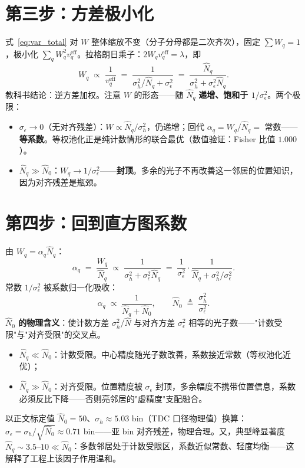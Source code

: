 \documentclass[11pt]{ctexart}
\begin{document}
\section{第三步：方差极小化}

式~\eqref{eq:var_total} 对 $W$ 整体缩放不变（分子分母都是二次齐次），固定 $\sum W_q=1$，极小化 $\sum_q W_q^2v^{\mathrm{eff}}_q$。拉格朗日乘子：$2W_qv^{\mathrm{eff}}_q=\lambda$，即
\begin{equation}
  W_q\;\propto\;\frac{1}{v^{\mathrm{eff}}_q}
  \;=\;\frac{1}{\sigma_h^2/\hat N_q+\sigma_\epsilon^2}
  \;=\;\frac{\hat N_q}{\sigma_h^2+\sigma_\epsilon^2\hat N_q}.
  \label{eq:W_opt}
\end{equation}
教科书结论：逆方差加权。注意 $W$ 的形态——随 $\hat N_q$ \textbf{递增、饱和于 $1/\sigma_\epsilon^2$}。两个极限：
\begin{itemize}
  \item $\sigma_\epsilon\to0$（无对齐残差）：$W\propto\hat N_q/\sigma_h^2$，仍递增；回代 $\alpha_q=W_q/\hat N_q=$ 常数——\textbf{等系数}。等权池化正是纯计数情形的联合最优（数值验证：Fisher 比值 $1.000$）。
  \item $\hat N_q\gg\hat N_0$：$W_q\to1/\sigma_\epsilon^2$——\textbf{封顶}。多余的光子不再改善这一邻居的位置知识，因为对齐残差是瓶颈。
\end{itemize}

\section{第四步：回到直方图系数}

由 $W_q=\alpha_q\hat N_q$：
\begin{equation}
  \alpha_q\;=\;\frac{W_q}{\hat N_q}
  \;\propto\;\frac{1}{\sigma_h^2+\sigma_\epsilon^2\hat N_q}
  \;=\;\frac{1}{\sigma_\epsilon^2}\cdot\frac{1}{\hat N_q+\sigma_h^2/\sigma_\epsilon^2}.
\end{equation}
常数 $1/\sigma_\epsilon^2$ 被系数归一化吸收：
\begin{equation}
  \boxed{\;\alpha_q\;\propto\;\frac{1}{\hat N_q+\hat N_0},
  \qquad \hat N_0\;\triangleq\;\frac{\sigma_h^2}{\sigma_\epsilon^2}.\;}
\end{equation}
\textbf{$\hat N_0$ 的物理含义}：使计数方差 $\sigma_h^2/\hat N$ 与对齐方差 $\sigma_\epsilon^2$ 相等的光子数——"计数受限"与"对齐受限"的交叉点。
\begin{itemize}
  \item $\hat N_q\ll\hat N_0$：计数受限。中心精度随光子数改善，系数接近常数（等权池化近优）；
  \item $\hat N_q\gg\hat N_0$：对齐受限。位置精度被 $\sigma_\epsilon$ 封顶，多余幅度不携带位置信息，系数必须反比下降——否则亮邻居的"虚精度"支配融合。
\end{itemize}
以正文标定值 $\hat N_0=50$、$\sigma_h\approx5.03$ bin（TDC 口径物理值）换算：$\sigma_\epsilon=\sigma_h/\sqrt{\hat N_0}\approx0.71$ bin——亚 bin 对齐残差，物理合理。又，典型峰显著度 $\hat N_q\sim3.5\text{--}10\ll\hat N_0$：多数邻居处于计数受限区，系数近似常数、轻度均衡——这解释了工程上该因子作用温和。
\end{document}
